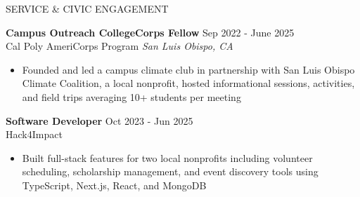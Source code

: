 \documentclass{resume} %
\begin{document}
\begin{rSection}{SERVICE \& CIVIC ENGAGEMENT}

\textbf{Campus Outreach CollegeCorps Fellow} \hfill Sep 2022 - June 2025 \\
Cal Poly AmeriCorps Program \hfill \textit{San Luis Obispo, CA}
 \vspace{-.8em}
 \begin{itemize}
    \itemsep -8pt {}
     \item Founded and led a campus climate club in partnership with San Luis Obispo Climate Coalition, a local nonprofit,
     hosted informational sessions, activities, and field trips averaging 10+ students per meeting
 \end{itemize}

\textbf{Software Developer} \hfill Oct 2023 - Jun 2025 \\
Hack4Impact \vspace{-.8em}
 \begin{itemize}
    \itemsep -8pt {} 
     \item Built full-stack features for two local nonprofits including volunteer scheduling, scholarship
     management, and event discovery tools using TypeScript, Next.js, React, and MongoDB
 \end{itemize}

\end{rSection} 

\end{document}
